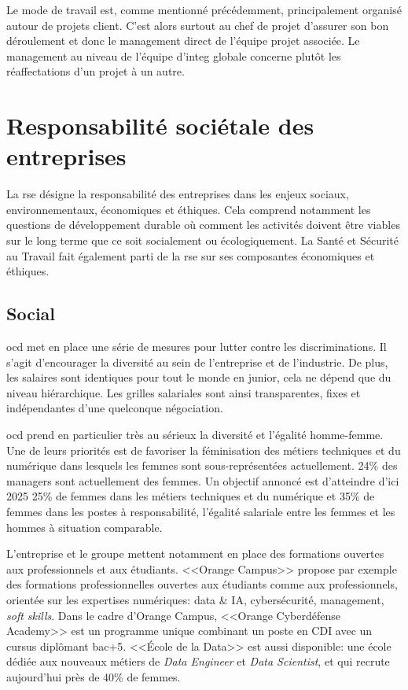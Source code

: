 \documentclass[12pt, oneside, a4paper, titlepage]{report}
\begin{document}
Le mode de travail est, comme mentionné précédemment, principalement organisé
autour de projets client. C'est alors surtout au chef de projet d'assurer son
bon déroulement et donc le management direct de l'équipe projet associée. Le
management au niveau de l'équipe d'\gls{integ} globale concerne plutôt les
réaffectations d'un projet à un autre.

\chapter{Responsabilité sociétale des entreprises}%
\label{cha:rse}

La \gls{rse} désigne la responsabilité des entreprises dans les enjeux sociaux,
environnementaux, économiques et éthiques. Cela comprend notamment les questions
de développement durable où comment les activités doivent être viables sur le
long terme que ce soit socialement ou écologiquement. La Santé et Sécurité au
Travail fait également parti de la \gls{rse} sur ses composantes économiques et
éthiques.

\section{Social}%
\label{sec:rse::social}

\acrlong{ocd} met en place une série de mesures pour lutter contre les
discriminations. Il s'agit d'encourager la diversité au sein de l'entreprise et
de l'industrie.  De plus, les salaires sont identiques pour tout le monde en
junior, cela ne dépend que du niveau hiérarchique. Les grilles salariales sont
ainsi transparentes, fixes et indépendantes d'une quelconque négociation.

\gls{ocd} prend en particulier très au sérieux la diversité et l'égalité
homme-femme. Une de leurs priorités est de favoriser la féminisation des métiers
techniques et du numérique dans lesquels les femmes sont sous-représentées
actuellement. 24\% des managers sont actuellement des femmes. Un objectif
annoncé est d'atteindre d'ici 2025 25\% de femmes dans les métiers techniques et
du numérique et 35\% de femmes dans les postes à responsabilité, l'égalité
salariale entre les femmes et les hommes à situation comparable.

L'entreprise et le groupe mettent notamment en place des formations ouvertes aux
professionnels et aux étudiants. <<Orange Campus>> propose par exemple des
formations professionnelles ouvertes aux étudiants comme aux professionnels,
orientée sur les expertises numériques: data \& IA, cybersécurité, management,
\textit{soft skills}. Dans le cadre d'Orange Campus, <<Orange Cyberdéfense
Academy>> est un programme unique combinant un poste en CDI avec un cursus
diplômant bac+5.  <<École de la Data>> est aussi disponible: une école dédiée
aux nouveaux métiers de \textit{Data Engineer} et \textit{Data Scientist}, et
qui recrute aujourd'hui près de 40\% de femmes.
\end{document}
